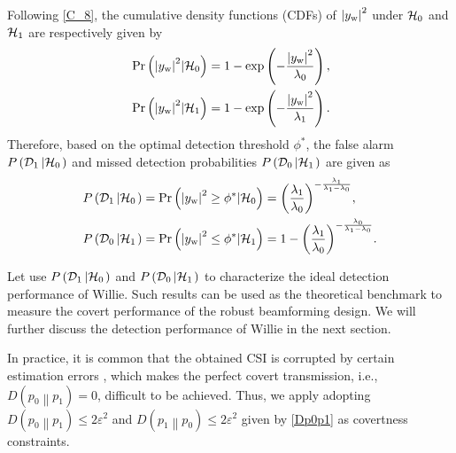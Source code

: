 \documentclass[10pt,journal,letterpaper,twocolumn,twoside]{IEEEtran} %
\begin{document}
Following \eqref{C_8},   the cumulative density functions (CDFs) of ${\left| {{y_{\rm{w}}}} \right|^2}$ under ${{{\cal H}_{\rm{0}}}}$ and ${{{\cal H}_{\rm{1}}}}$ are respectively given by
\begin{subequations}\label{C_9}
\begin{align}
 &\Pr \left( {{{\left| {{y_{\rm{w}}}} \right|}^2}|{\cal{H}_{\rm{0}}}} \right) = 1 - \exp \left( { - \frac{{{{\left| {{y_{\rm{w}}}} \right|}^2}}}{{{\lambda _0}}}} \right), \\
 &\Pr \left( {{{\left| {{y_{\rm{w}}}} \right|}^2}|{\cal{H}_{\rm{1}}}} \right) = 1 - \exp \left( { - \frac{{{{\left| {{y_{\rm{w}}}} \right|}^2}}}{{{\lambda _1}}}} \right).
 \end{align}
\end{subequations}
Therefore,  based on   the optimal detection threshold ${\phi ^*}$, the false alarm $ P \left( {{{\cal D}_1}\left| {{{\cal H}_0}} \right.} \right)$ and   missed detection probabilities   $P \left( {{{\cal D}_0}\left| {{{\cal H}_1}} \right.} \right)$  are given as
\begin{subequations}
\begin{align}
 &P \left( {{{\cal D}_1}\left| {{{\cal H}_0}} \right.} \right)= {\Pr}\left( {{{\left| {{y_{\rm{w}}}} \right|}^2} \ge {\phi ^*}|{{{\cal H}_{\rm{0}}}}} \right) = {\left( {\frac{{{\lambda _1}}}{{{\lambda _0}}}} \right)^{ - \frac{{{\lambda _1}}}{{{\lambda _1} - {\lambda _0}}}}}, \\
 &P \left( {{{\cal D}_0}\left| {{{\cal H}_1}} \right.} \right) = {\Pr}\left( {{{\left| {{y_{\rm{w}}}} \right|}^2} \le {\phi ^*}|{{{\cal H}_{\rm{1}}}}} \right)  = 1 - {\left( {\frac{{{\lambda _1}}}{{{\lambda _0}}}} \right)^{ - \frac{{{\lambda _0}}}{{{\lambda _1} - {\lambda _0}}}}}.
\end{align}
\end{subequations}


Let use $P \left( {{{\cal D}_1}\left| {{{\cal H}_0}} \right.} \right)$ and $P \left( {{{\cal D}_0}\left| {{{\cal H}_1}} \right.} \right)$ to characterize the ideal detection performance of Willie. Such results can be used as
the theoretical benchmark to measure the covert performance
of the robust beamforming design. We will further discuss the detection performance of Willie in the next section.

 In practice, it is common that the obtained CSI is corrupted by certain estimation errors \cite{Wornell16,Bloch16}, which makes the perfect covert transmission, i.e., $D\left( {{p_0}\left\| {{p_1}} \right.} \right) = 0$,  difficult to be achieved. Thus, we apply adopting     $D\left( {{p_0}\left\| {{p_1}} \right.} \right) \le 2{\varepsilon ^2}$ and
$D\left( {{p_1}\left\| {{p_0}} \right.} \right) \le 2{\varepsilon ^2}$ given by \eqref{Dp0p1} as covertness constraints\cite{Bash13,Wornell16,Bloch16,Yan2019Gaussian}.
\end{document}
